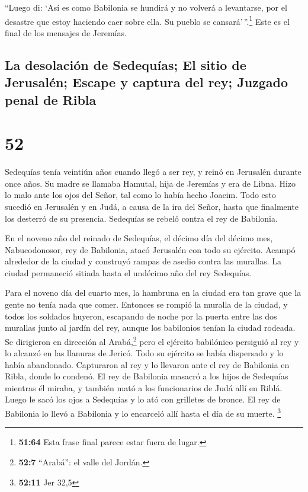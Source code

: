  ``Luego di: `Así es como Babilonia se hundirá y no
volverá a levantarse, por el desastre que estoy haciendo caer sobre
ella. Su pueblo se cansará'\,''.\footnote{\textbf{51:64} Esta frase
  final parece estar fuera de lugar.} Este es el final de los mensajes
de Jeremías.

\hypertarget{la-desolaciuxf3n-de-sedequuxedas-el-sitio-de-jerusaluxe9n-escape-y-captura-del-rey-juzgado-penal-de-ribla}{%
\subsection{La desolación de Sedequías; El sitio de Jerusalén; Escape y
captura del rey; Juzgado penal de
Ribla}\label{la-desolaciuxf3n-de-sedequuxedas-el-sitio-de-jerusaluxe9n-escape-y-captura-del-rey-juzgado-penal-de-ribla}}

\hypertarget{section-51}{%
\section{52}\label{section-51}}

 Sedequías tenía veintiún años cuando llegó a ser rey, y
reinó en Jerusalén durante once años. Su madre se llamaba Hamutal, hija
de Jeremías y era de Libna.  Hizo lo malo ante los ojos
del Señor, tal como lo había hecho Joacim.  Todo esto
sucedió en Jerusalén y en Judá, a causa de la ira del Señor, hasta que
finalmente los desterró de su presencia. Sedequías se rebeló contra el
rey de Babilonia.

 En el noveno año del reinado de Sedequías, el décimo día
del décimo mes, Nabucodonosor, rey de Babilonia, atacó Jerusalén con
todo su ejército. Acampó alrededor de la ciudad y construyó rampas de
asedio contra las murallas.  La ciudad permaneció sitiada
hasta el undécimo año del rey Sedequías.

 Para el noveno día del cuarto mes, la hambruna en la
ciudad era tan grave que la gente no tenía nada que comer.
 Entonces se rompió la muralla de la ciudad, y todos los
soldados huyeron, escapando de noche por la puerta entre las dos
murallas junto al jardín del rey, aunque los babilonios tenían la ciudad
rodeada. Se dirigieron en dirección al Arabá,\footnote{\textbf{52:7}
  ``Arabá'': el valle del Jordán.}  pero el ejército
babilónico persiguió al rey y lo alcanzó en las llanuras de Jericó. Todo
su ejército se había dispersado y lo había abandonado. 
Capturaron al rey y lo llevaron ante el rey de Babilonia en Ribla, donde
lo condenó.  El rey de Babilonia masacró a los hijos de
Sedequías mientras él miraba, y también mató a los funcionarios de Judá
allí en Riblá.  Luego le sacó los ojos a Sedequías y lo
ató con grilletes de bronce. El rey de Babilonia lo llevó a Babilonia y
lo encarceló allí hasta el día de su muerte. \footnote{\textbf{52:11}
  Jer 32,5}

